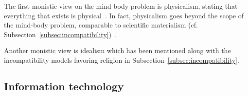 The first monistic view on the mind-body problem is physicalism, stating that everything that exists is physical~\cite{stoljar2010physicalism}. In fact, physicalism goes beyond the scope of the mind-body problem, comparable to scientific materialism (cf. Subsection~\ref{subsec:incompatibility})~\cite{Crane1990}.

Another monistic view is idealism which has been mentioned along with the incompatibility models favoring religion in Subsection~\ref{subsec:incompatibility}.
\lipsum[2]

\lipsum[2]



\subsection{Information technology}

